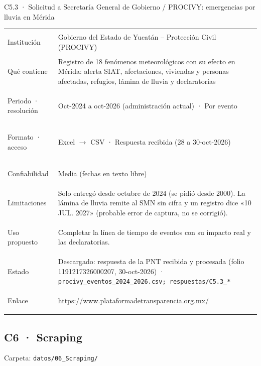 \documentclass[11pt,a4paper]{article}
\begin{document}
\begin{ficha}{C5.3 · Solicitud a Secretaría General de Gobierno / PROCIVY: emergencias por lluvia en Mérida}
\begin{tabularx}{\linewidth}{@{}>{\leavevmode\color{tinta2}\bfseries\raggedright\arraybackslash}p{2.9cm}X@{}}
Institución & Gobierno del Estado de Yucatán – Protección Civil (PROCIVY) \\
Qué contiene & Registro de 18 fenómenos meteorológicos con su efecto en Mérida: alerta SIAT, afectaciones, viviendas y personas afectadas, refugios, lámina de lluvia y declaratorias \\
Periodo · resolución & Oct-2024 a oct-2026 (administración actual) · Por evento \\
Formato · acceso & Excel $\rightarrow$ CSV · Respuesta recibida (28 a 30-oct-2026) \\
Confiabilidad & Media (fechas en texto libre) \\
Limitaciones & Solo entregó desde octubre de 2024 (se pidió desde 2000). La lámina de lluvia remite al SMN sin cifra y un registro dice «10 JUL. 2027» (probable error de captura, no se corrigió). \\
Uso propuesto & Completar la línea de tiempo de eventos con su impacto real y las declaratorias. \\
Estado & Descargado: respuesta de la PNT recibida y procesada (folio 1191217326000207, 30-oct-2026) · {\small\nolinkurl{procivy_eventos_2024_2026.csv; respuestas/C5.3_*}} \\
Enlace & \url{https://www.plataformadetransparencia.org.mx/} \\
\end{tabularx}
\end{ficha}
\subsection{C6 · Scraping}
{\small\color{tinta2}Carpeta: \nolinkurl{datos/06_Scraping/}}
\end{document}
